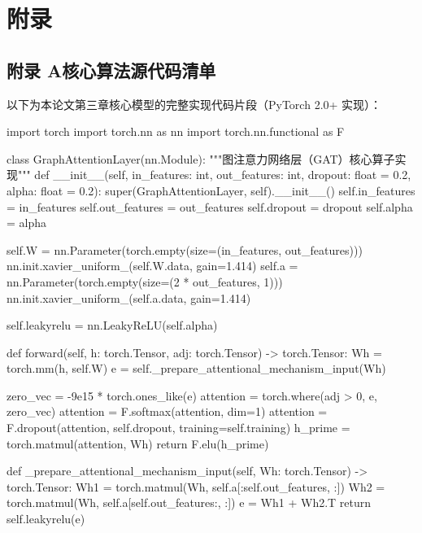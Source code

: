 

{}
\chapter*{附\quad 录}

\section*{附录 A\quad 核心算法源代码清单}

以下为本论文第三章核心模型的完整实现代码片段（PyTorch 2.0+ 实现）：

\begin{codeblock}[language=Python]
import torch
import torch.nn as nn
import torch.nn.functional as F

class GraphAttentionLayer(nn.Module):
    """图注意力网络层（GAT）核心算子实现"""
    def __init__(self, in_features: int, out_features: int, dropout: float = 0.2, alpha: float = 0.2):
        super(GraphAttentionLayer, self).__init__()
        self.in_features = in_features
        self.out_features = out_features
        self.dropout = dropout
        self.alpha = alpha

        self.W = nn.Parameter(torch.empty(size=(in_features, out_features)))
        nn.init.xavier_uniform_(self.W.data, gain=1.414)
        self.a = nn.Parameter(torch.empty(size=(2 * out_features, 1)))
        nn.init.xavier_uniform_(self.a.data, gain=1.414)

        self.leakyrelu = nn.LeakyReLU(self.alpha)

    def forward(self, h: torch.Tensor, adj: torch.Tensor) -> torch.Tensor:
        Wh = torch.mm(h, self.W)
        e = self._prepare_attentional_mechanism_input(Wh)

        zero_vec = -9e15 * torch.ones_like(e)
        attention = torch.where(adj > 0, e, zero_vec)
        attention = F.softmax(attention, dim=1)
        attention = F.dropout(attention, self.dropout, training=self.training)
        h_prime = torch.matmul(attention, Wh)
        return F.elu(h_prime)

    def _prepare_attentional_mechanism_input(self, Wh: torch.Tensor) -> torch.Tensor:
        Wh1 = torch.matmul(Wh, self.a[:self.out_features, :])
        Wh2 = torch.matmul(Wh, self.a[self.out_features:, :])
        e = Wh1 + Wh2.T
        return self.leakyrelu(e)
\end{codeblock}


